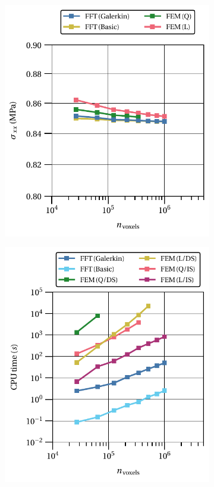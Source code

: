 \begin{figure}[hbt] %
  \centering
	\begin{subfigure}[b]{0.49\textwidth}
    \centering
    \includegraphics[width=\textwidth]{figures/linear_3D_normal_homo_stress_11_vs_n_voxels}
    \caption{}
    \label{subfig:linear_3D_normal_homo_stress_11_vs_n_voxels}
  \end{subfigure}
  \begin{subfigure}[b]{0.49\textwidth}
    \centering
    \includegraphics[width=\textwidth]{figures/linear_3D_normal_cpu_time_vs_n_voxels}

\end{subfigure}
\end{figure}
